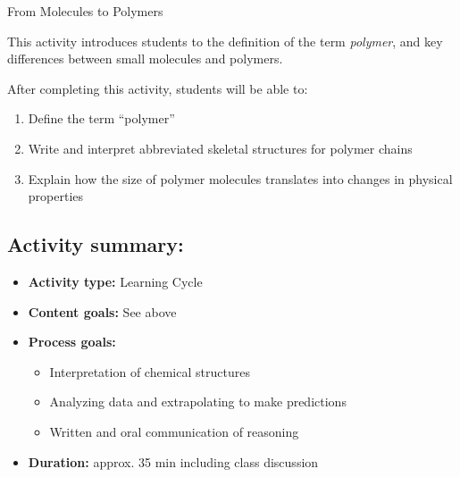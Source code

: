 %
%
%
%

\renewcommand{\figpath}{content/intro/molecules-to-polymers/figs}
\renewcommand{\labelbase}{molecules-to-polymers}

\begin{activity}{From Molecules to Polymers}

\begin{instructornotes}

	This activity introduces students to the definition of the term \emph{polymer}, and key differences between small molecules and polymers.
	
	After completing this activity, students will be able to:
			\begin{enumerate}
				\item Define the term ``polymer''
				\item Write and interpret abbreviated skeletal structures for polymer chains
				\item Explain how the size of polymer molecules translates into changes in physical properties
			\end{enumerate}
			
	\subsection*{Activity summary:}
	\begin{itemize}
		\item \textbf{Activity type:} Learning Cycle
		\item \textbf{Content goals:} See above
		\item \textbf{Process goals:} %
			\begin{itemize}
				\item Interpretation of chemical structures
				\item Analyzing data and extrapolating to make predictions
				\item Written and oral communication of reasoning
			\end{itemize}
		\item \textbf{Duration:} approx. 35 min including class discussion
	

\end{itemize}
\end{instructornotes}
\end{activity}
